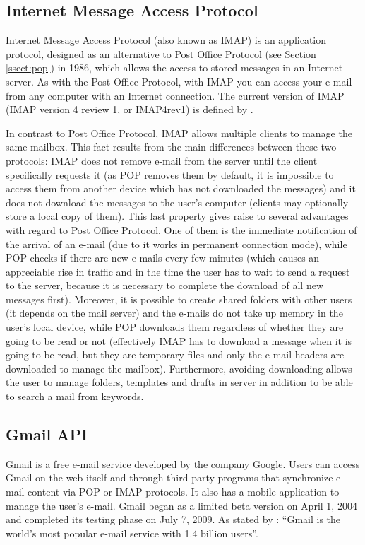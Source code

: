 \subsection{Internet Message Access Protocol} \label{ssect:imap}

Internet Message Access Protocol (also known as IMAP) is an application protocol, designed as an alternative to Post Office Protocol (see Section \ref{ssect:pop}) in 1986, which allows the access to stored messages in an Internet server. As with the Post Office Protocol, with IMAP you can access your e-mail from any computer with an Internet connection. The current version of IMAP (IMAP version 4 review 1, or IMAP4rev1) is defined by \cite{rfc3501}.

In contrast to Post Office Protocol, IMAP allows multiple clients to manage the same mailbox. This fact results from the main differences between these two protocols: IMAP does not remove e-mail from the server until the client specifically requests it (as POP removes them by default, it is impossible to access them from another device which has not downloaded the messages) and it does not download the messages to the user's computer (clients may optionally store a local copy of them). This last property gives raise to several advantages with regard to Post Office Protocol. One of them is the immediate notification of the arrival of an e-mail (due to it works in permanent connection mode), while POP checks if there are new e-mails every few minutes (which causes an appreciable rise in traffic and in the time the user has to wait to send a request to the server, because it is necessary to complete the download of all new messages first). Moreover, it is possible to create shared folders with other users (it depends on the mail server) and the e-mails do not take up memory in the user's local device, while POP downloads them regardless of whether they are going to be read or not (effectively IMAP has to download a message when it is going to be read, but they are temporary files and only the e-mail headers are downloaded to manage the mailbox). Furthermore, avoiding downloading allows the user to manage folders, templates and drafts in server in addition to be able to search a mail from keywords.

\subsection{Gmail API}\label{ssect:gmailapi}
Gmail is a free e-mail service developed by the company Google. Users can access Gmail on the web itself and through third-party programs that synchronize e-mail content via POP or IMAP protocols. It also has a mobile application to manage the user's e-mail. Gmail began as a limited beta version on April 1, 2004 and completed its testing phase on July 7, 2009. As stated by \cite{gmailbbc}: ``Gmail is the world's most popular e-mail service with 1.4 billion users''.


